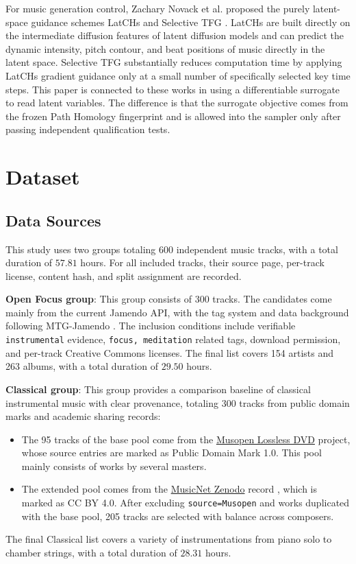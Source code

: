 \documentclass{article}
\begin{document}
For music generation control, Zachary Novack et al. proposed the purely latent-space guidance schemes LatCHs and Selective TFG \cite{novack2026}. LatCHs are built directly on the intermediate diffusion features of latent diffusion models and can predict the dynamic intensity, pitch contour, and beat positions of music directly in the latent space. Selective TFG substantially reduces computation time by applying LatCHs gradient guidance only at a small number of specifically selected key time steps. This paper is connected to these works in using a differentiable surrogate to read latent variables. The difference is that the surrogate objective comes from the frozen Path Homology fingerprint and is allowed into the sampler only after passing independent qualification tests.

\section{Dataset}

\subsection{Data Sources}

This study uses two groups totaling 600 independent music tracks, with a total duration of $57.81$ hours. For all included tracks, their source page, per-track license, content hash, and split assignment are recorded.

\textbf{Open Focus group}: This group consists of 300 tracks. The candidates come mainly from the current Jamendo API, with the tag system and data background following MTG-Jamendo \cite{bogdanov2019mtg}. The inclusion conditions include verifiable \verb|instrumental| evidence, \verb|focus, meditation| related tags, download permission, and per-track Creative Commons licenses. The final list covers 154 artists and 263 albums, with a total duration of $29.50$ hours.

\textbf{Classical group}: This group provides a comparison baseline of classical instrumental music with clear provenance, totaling 300 tracks from public domain marks and academic sharing records:
\begin{itemize}
  \item The 95 tracks of the base pool come from the \href{https://archive.org/details/musopen-lossless-dvd}{Musopen Lossless DVD} project, whose source entries are marked as Public Domain Mark 1.0. This pool mainly consists of works by several masters.
  \item The extended pool comes from the \href{https://doi.org/10.5281/zenodo.5120004}{MusicNet Zenodo} record \cite{john_thickstun_2016_5120004}, which is marked as CC BY 4.0. After excluding \verb|source=Musopen| and works duplicated with the base pool, 205 tracks are selected with balance across composers.
\end{itemize}
The final Classical list covers a variety of instrumentations from piano solo to chamber strings, with a total duration of $28.31$ hours.
\end{document}
